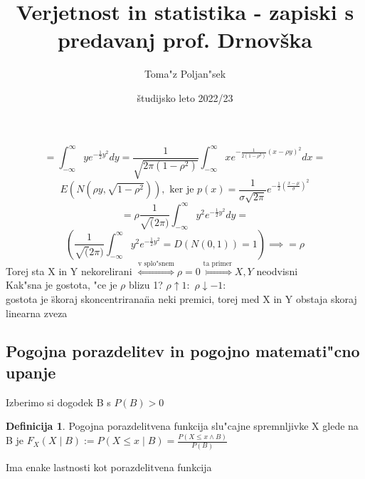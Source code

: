 \documentclass[a4paper,12pt]{article}
\theoremstyle{definition}
\newtheorem{defn}[counter]{Definicija}
\theoremstyle{remark}
\begin{document}
\title{Verjetnost in statistika - zapiski s predavanj prof. Drnovška}
\author{
	Toma"z Poljan"sek
}
\date{študijsko leto 2022/23}
\maketitle


\tableofcontents
\newpage
{}





\[= \int_{-\infty}^{\infty} y e^{-\frac{1}{2}y^2} dy = \frac{1}{\sqrt{2\pi (1-\rho^2)}}
\int_{-\infty}^{\infty} x e^{-\frac{1}{2(1-\rho^2)} (x - \rho y)^2} dx =\]
\[E(N(\rho y, \sqrt{1-\rho^2})), \text{ ker je } p(x) = \frac{1}{\sigma \sqrt{2\pi}}
e^{-\frac{1}{2} (\frac{x - \mu}{\sigma})^2}\]
\[= \rho \frac{1}{\sqrt(2\pi)} \int_{-\infty}^{\infty} y^2 e^{-\frac{1}{2} y^2} dy =\]
\[(\frac{1}{\sqrt(2\pi)} \int_{-\infty}^{\infty} y^2 e^{-\frac{1}{2} y^2} = D(N(0,1)) = 1) \implies = \rho\]
Torej sta X in Y nekorelirani $\stackrel{\text{v splo"snem}}{\iff} \rho = 0 \stackrel{\text{ta primer}}{\iff}
X, Y$ neodvisni \\
Kak"sna je gostota, "ce je $\rho$ blizu 1?
$\rho \uparrow 1:$ %
$\rho \downarrow -1:$ \\ %
gostota je \"skoraj skoncentrirana\" na neki premici, torej med X in Y obstaja skoraj linearna zveza

\subsection{Pogojna porazdelitev in pogojno matemati"cno upanje}

Izberimo si dogodek B s $P(B) > 0$

\begin{defn}
    Pogojna porazdelitvena funkcija slu"cajne spremnljivke X glede na B je $F_X(X \mid B) := P(X \leq x \mid B) =
    \frac{P(X \leq x \land B)}{P(B)}$ \\
\end{defn}

Ima enake lastnosti kot porazdelitvena funkcija
\end{document}
